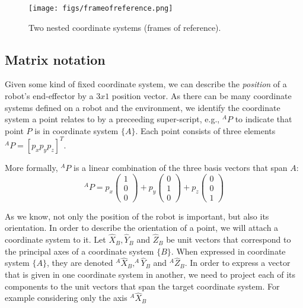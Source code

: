 \begin{figure}
	\centering
		\texttt{[image: figs/frameofreference.png]}
	\caption{Two nested coordinate systems (frames of reference).}
	\label{fig:nestedcoords}
\end{figure}

\subsection{Matrix notation}
Given some kind of fixed coordinate system, we can describe the \emph{position} of a robot's end-effector by a $3x1$ position vector. As there can be many coordinate systems defined on a robot and the environment, we identify the coordinate system a point relates to by a preceeding super-script, e.g., $ ^AP$ to indicate that point $P$ is in coordinate system $\{A\}$. Each point consists of three elements $ ^AP=[p_x p_y p_z]^T$.

More formally, $^AP$ is a linear combination of the three basis vectors that span $A$:
\begin{equation}
^AP=p_x\left(\begin{array}{c}1\\0\\0\end{array}\right)+p_y\left(\begin{array}{c}0\\1\\0\end{array}\right)+p_z\left(\begin{array}{c}0\\0\\1\end{array}\right)\label{eq:basis}
\end{equation}

As we know, not only the position of the robot is important, but also its orientation. In order to describe the orientation of a point, we will attach a coordinate system to it. Let $ \hat{X}_B, \hat{Y}_B$ and $ \hat{Z}_B$ be unit vectors that correspond to the principal axes of a coordinate system $\{B\}$. When expressed in coordinate system $\{A\}$, they are denoted $^A\hat{X}_B, ^A\hat{Y}_B$ and $ ^A\hat{Z}_B$. In order to express a vector that is given in one coordinate system in another, we need to project each of its components to the unit vectors that span the target coordinate system. For example considering only the axis $^A\hat{X}_B$

